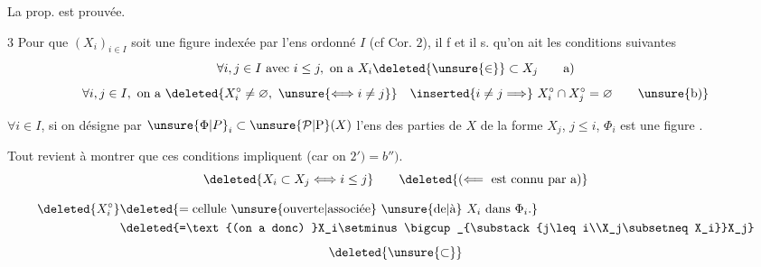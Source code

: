 La prop. est prouvée.

 $3$ Pour que $(X_i)_{i\in I}$ soit une figure  indexée par l'ens ordonné $I$ (cf Cor. $2$), il f et il s. qu'on ait les conditions suivantes
\[
\forall i,j\in I\ \text{avec }i\leq j,\ \text{on a }X_i\deleted{\unsure{\in}}\subset X_j\tag*{a)}
\]
\[
\forall i,j\in I,\ \text{on a }\deleted{X_i^\circ\ne\varnothing,\ \unsure{\Longleftrightarrow i\ne j}}\quad\inserted{i\ne j\Longrightarrow}\ X_i^\circ\cap X_j^\circ=\varnothing\tag*{\unsure{b)}}
\]

 $\forall i\in I$, si on désigne par $\unsure{\Phi|P}_i\subset\unsure{\mathcal{P}|\mathrm{P}}(X)$ l'ens des parties de $X$ de la forme $X_j$, $j\leq i$, $\Phi_i$ est une figure .

 

Tout revient à montrer que ces conditions  impliquent   (car on     $2')=b'')$.
\[
\deleted{X_i\subset X_j\Longleftrightarrow i\leq j}\qquad\deleted{(\Longleftarrow\text{ est connu par a})}
\]


\[
\begin{aligned}
\deleted{X_i^\circ}&\deleted{=\text{cellule \unsure{ouverte|associée} \unsure{de|à} }X_i\text{ dans }\Phi_i.}\\
&\deleted{=\text{(on a donc) }X_i\setminus\bigcup_{\substack{j\leq i\\X_j\subsetneq X_i}}X_j}
\end{aligned}
\]
\[
\deleted{\unsure{\subset}}
\]

